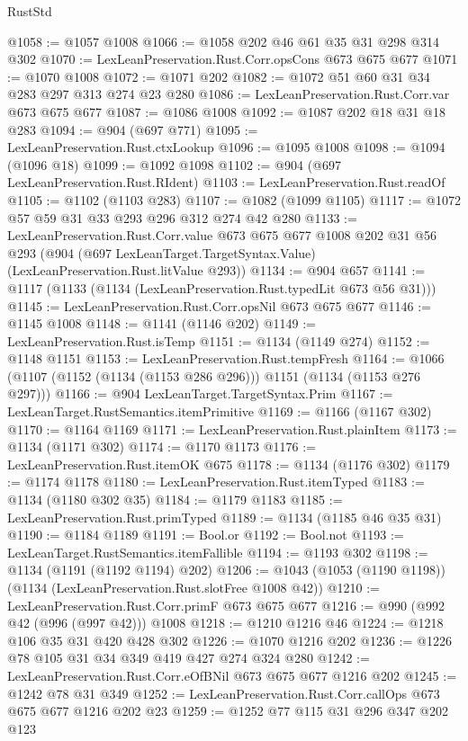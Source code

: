 \begin{lexlean}{RustStd}
\begin{coremodule}
@1058 := @1057 @1008
@1066 := @1058 @202 @46 @61 @35 @31 @298 @314 @302
@1070 := LexLeanPreservation.Rust.Corr.opsCons @673 @675 @677
@1071 := @1070 @1008
@1072 := @1071 @202
@1082 := @1072 @51 @60 @31 @34 @283 @297 @313 @274 @23 @280
@1086 := LexLeanPreservation.Rust.Corr.var @673 @675 @677
@1087 := @1086 @1008
@1092 := @1087 @202 @18 @31 @18 @283
@1094 := @904 (@697 @771)
@1095 := LexLeanPreservation.Rust.ctxLookup
@1096 := @1095 @1008
@1098 := @1094 (@1096 @18)
@1099 := @1092 @1098
@1102 := @904 (@697 LexLeanPreservation.Rust.RIdent)
@1103 := LexLeanPreservation.Rust.readOf
@1105 := @1102 (@1103 @283)
@1107 := @1082 (@1099 @1105)
@1117 := @1072 @57 @59 @31 @33 @293 @296 @312 @274 @42 @280
@1133 := LexLeanPreservation.Rust.Corr.value
    @673
    @675
    @677
    @1008
    @202
    @31
    @56
    @293
    (@904 (@697 LexLeanTarget.TargetSyntax.Value) (LexLeanPreservation.Rust.litValue @293))
@1134 := @904 @657
@1141 := @1117 (@1133 (@1134 (LexLeanPreservation.Rust.typedLit @673 @56 @31)))
@1145 := LexLeanPreservation.Rust.Corr.opsNil @673 @675 @677
@1146 := @1145 @1008
@1148 := @1141 (@1146 @202)
@1149 := LexLeanPreservation.Rust.isTemp
@1151 := @1134 (@1149 @274)
@1152 := @1148 @1151
@1153 := LexLeanPreservation.Rust.tempFresh
@1164 := @1066 (@1107 (@1152 (@1134 (@1153 @286 @296))) @1151 (@1134 (@1153 @276 @297)))
@1166 := @904 LexLeanTarget.TargetSyntax.Prim
@1167 := LexLeanTarget.RustSemantics.itemPrimitive
@1169 := @1166 (@1167 @302)
@1170 := @1164 @1169
@1171 := LexLeanPreservation.Rust.plainItem
@1173 := @1134 (@1171 @302)
@1174 := @1170 @1173
@1176 := LexLeanPreservation.Rust.itemOK @675
@1178 := @1134 (@1176 @302)
@1179 := @1174 @1178
@1180 := LexLeanPreservation.Rust.itemTyped
@1183 := @1134 (@1180 @302 @35)
@1184 := @1179 @1183
@1185 := LexLeanPreservation.Rust.primTyped
@1189 := @1134 (@1185 @46 @35 @31)
@1190 := @1184 @1189
@1191 := Bool.or
@1192 := Bool.not
@1193 := LexLeanTarget.RustSemantics.itemFallible
@1194 := @1193 @302
@1198 := @1134 (@1191 (@1192 @1194) @202)
@1206 := @1043 (@1053 (@1190 @1198)) (@1134 (LexLeanPreservation.Rust.slotFree @1008 @42))
@1210 := LexLeanPreservation.Rust.Corr.primF @673 @675 @677
@1216 := @990 (@992 @42 (@996 (@997 @42))) @1008
@1218 := @1210 @1216 @46
@1224 := @1218 @106 @35 @31 @420 @428 @302
@1226 := @1070 @1216 @202
@1236 := @1226 @78 @105 @31 @34 @349 @419 @427 @274 @324 @280
@1242 := LexLeanPreservation.Rust.Corr.eOfBNil @673 @675 @677 @1216 @202
@1245 := @1242 @78 @31 @349
@1252 := LexLeanPreservation.Rust.Corr.callOps @673 @675 @677 @1216 @202 @23
@1259 := @1252 @77 @115 @31 @296 @347 @202 @123

\end{coremodule}
\end{lexlean}
